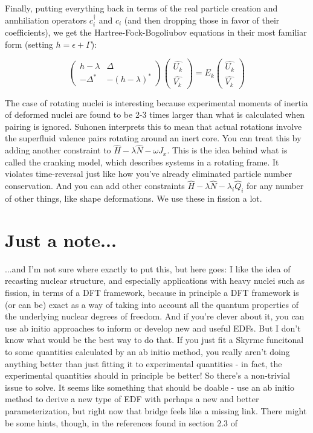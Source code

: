 Finally, putting everything back in terms of the real particle creation and annhiliation operators $c_i^\dagger$ and $c_i$ (and then dropping those in favor of their coefficients), we get the Hartree-Fock-Bogoliubov equations in their most familiar form (setting $h=\epsilon+\Gamma$):

\begin{equation}
\left(\begin{array}{cc}
h-\lambda & \Delta \\
-\Delta^* & -(h-\lambda)^*
\end{array}\right) \left(\begin{array}{c}
\hat{U_k} \\
\hat{V_k}
\end{array}\right)
= E_k\left(\begin{array}{c}
\hat{U_k} \\
\hat{V_k}
\end{array}\right)
\end{equation}

The case of rotating nuclei is interesting because experimental moments of inertia of deformed nuclei are found to be 2-3 times larger than what is calculated when pairing is ignored. Suhonen interprets this to mean that actual rotations involve the superfluid valence pairs rotating around an inert core. You can treat this by adding another constraint to $\hat{H} - \lambda\hat{N} - \omega J_x$. This is the idea behind what is called the cranking model, which describes systems in a rotating frame. It violates time-reversal just like how you've already eliminated particle number conservation. And you can add other constraints $\hat{H} - \lambda\hat{N} - \lambda_i \hat{Q}_i$ for any number of other things, like shape deformations. We use these in fission a lot.

\section*{Just a note...}
...and I'm not sure where exactly to put this, but here goes: I like the idea of recasting nuclear structure, and especially applications with heavy nuclei such as fission, in terms of a DFT framework, because in principle a DFT framework is (or can be) exact as a way of taking into account all the quantum properties of the underlying nuclear degrees of freedom. And if you're clever about it, you can use ab initio approaches to inform or develop new and useful EDFs. But I don't know what would be the best way to do that. If you just fit a Skyrme funcitonal to some quantities calculated by an ab initio method, you really aren't doing anything better than just fitting it to experimental quantities - in fact, the experimental quantities should in principle be better! So there's a non-trivial issue to solve. It seems like something that should be doable - use an ab initio method to derive a new type of EDF with perhaps a new and better parameterization, but right now that bridge feels like a missing link. There might be some hints, though, in the references found in section 2.3 of \cite{Schunck2015error_analysis}

%